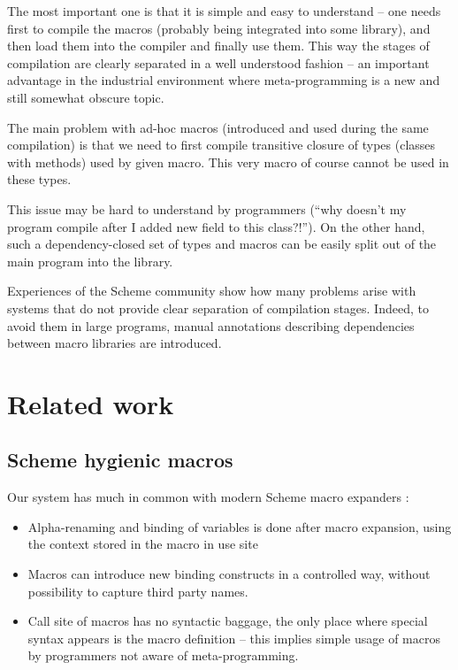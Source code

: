 \documentclass{llncs}
\begin{document}
The most important one is that it is simple and easy to understand --
one needs first to compile the macros (probably being integrated into
some library), and then load them into the compiler and finally use
them. This way the stages of compilation are clearly separated in a well
understood fashion -- an important advantage in the industrial environment
where meta-programming is a new and still somewhat obscure topic.

The main problem with ad-hoc macros (introduced and used during the
same compilation) is that we need to first compile transitive closure
of types (classes with methods) used by given macro. This very macro
of course cannot be used in these types.

This issue may be hard to understand by programmers (``why doesn't my program
compile after I added new field to this class?!''). On the
other hand, such a dependency-closed set of types and macros can be
easily split out of the main program into the library.

Experiences of the Scheme community show \cite{Scheme:Compilable} how many
problems arise with systems that do not provide clear separation of 
compilation stages. Indeed, to avoid them in large programs, manual
annotations describing dependencies between macro libraries are introduced.


\section{Related work}
\subsection{Scheme hygienic macros}
Our system has much in common with modern Scheme macro expanders \cite{Scheme:HygienicAlg}:
\begin{itemize}
\item Alpha-renaming and binding of variables is done after macro expansion, using
      the context stored in the macro in use site
\item Macros can introduce new binding constructs in a controlled way,
      without possibility to capture third party names.
\item Call site of macros has no syntactic baggage, the only place where
      special syntax appears is the macro definition -- this implies simple
      usage of macros by programmers not aware of meta-programming.
\end{itemize}
\end{document}
